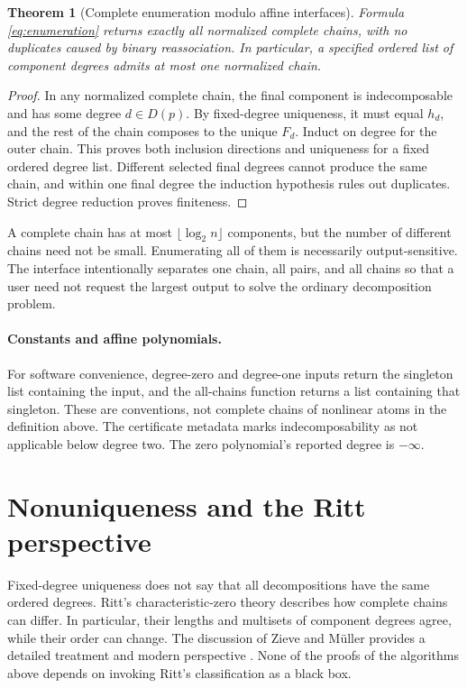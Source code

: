 \documentclass[11pt,a4paper]{article}
\numberwithin{equation}{section}
\newtheorem{theorem}{Theorem}[section]
\theoremstyle{definition}
\theoremstyle{remark}
\begin{document}
\begin{theorem}[Complete enumeration modulo affine interfaces]
\label{thm:enumeration}
Formula \eqref{eq:enumeration} returns exactly all normalized complete chains,
with no duplicates caused by binary reassociation. In particular, a specified
ordered list of component degrees admits at most one normalized chain.
\end{theorem}
\begin{proof}
In any normalized complete chain, the final component is indecomposable and
has some degree $d\in D(p)$. By fixed-degree uniqueness, it must equal $h_d$,
and the rest of the chain composes to the unique $F_d$. Induct on degree for
the outer chain. This proves both inclusion directions and uniqueness for a
fixed ordered degree list. Different selected final degrees cannot produce
the same chain, and within one final degree the induction hypothesis rules
out duplicates. Strict degree reduction proves finiteness.
\end{proof}

A complete chain has at most $\lfloor\log_2 n\rfloor$ components, but the
number of different chains need not be small. Enumerating all of them is
necessarily output-sensitive. The interface intentionally separates one
chain, all pairs, and all chains so that a user need not request the largest
output to solve the ordinary decomposition problem.

\paragraph{Constants and affine polynomials.}
For software convenience, degree-zero and degree-one inputs return the
singleton list containing the input, and the all-chains function returns a
list containing that singleton. These are conventions, not complete chains
of nonlinear atoms in the definition above. The certificate metadata marks
indecomposability as not applicable below degree two. The zero polynomial's
reported degree is $-\infty$.

\section{Nonuniqueness and the Ritt perspective}
\label{sec:ritt}
Fixed-degree uniqueness does not say that all decompositions have the same
ordered degrees. Ritt's characteristic-zero theory describes how complete
chains can differ. In particular, their lengths and multisets of component
degrees agree, while their order can change. The discussion of Zieve and
M\"uller provides a detailed treatment and modern perspective \cite{ZM}.
None of the proofs of the algorithms above depends on invoking Ritt's
classification as a black box.
\end{document}
